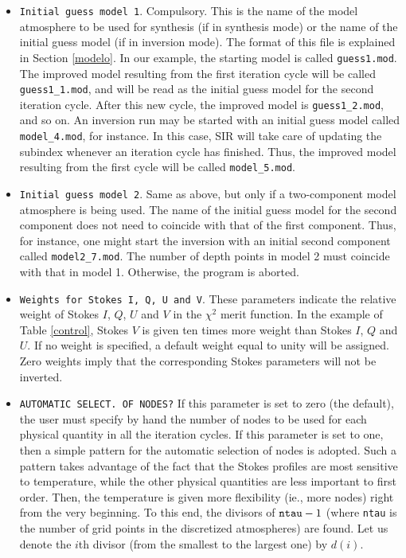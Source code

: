 \documentclass[11pt]{report}
\begin{document}
\begin{itemize}
\item {\tt Initial guess model 1}. Compulsory. This is the name of the model
atmosphere to be used for synthesis (if in synthesis mode) or the name of 
the initial guess model (if in inversion mode). The format of this file is
explained in Section \ref{modelo}. In our example, the starting model
is called {\tt guess1.mod}. The improved model resulting from the first iteration
cycle will be called {\tt guess1\_1.mod}, and will be read as the initial guess model
for the second iteration cycle. After this new cycle, the improved model is
{\tt guess1\_2.mod}, and so on. An inversion run may be started with an initial
guess model called {\tt model\_4.mod}, for instance. In this case, SIR will take
care of updating the subindex whenever an iteration cycle has finished. Thus, the
improved model resulting from the first cycle will be called {\tt model\_5.mod}. 

\item {\tt Initial guess model 2}. Same as above, but only if a two-component 
model atmosphere is being used. The name of the initial guess model for the second
component does not need to coincide with that of the first component. Thus, 
for instance, one might start the inversion with an initial second component
called {\tt model2\_7.mod}. The number of depth points in model 2 must coincide
with that in model 1. Otherwise, the program is aborted.

\item {\tt Weights for Stokes I, Q, U and V}. These parameters indicate
the relative weight of Stokes $I$, $Q$, $U$ and $V$ in the $\chi^2$
merit function. In the example of Table \ref{control}, Stokes $V$ is
given ten times more weight than Stokes $I$, $Q$ and $U$. If no weight
is specified, a default weight equal to unity will be assigned. Zero
weights imply that the corresponding Stokes parameters will not be
inverted.

\item {\tt AUTOMATIC SELECT. OF NODES?} If this parameter is set to
zero (the default), the user must specify by hand the number of nodes
to be used for each physical quantity in all the iteration cycles. If this
parameter is set to one, then a simple pattern for the automatic
selection of nodes is adopted. Such a pattern takes advantage of the
fact that the Stokes profiles are most sensitive to temperature, while
the other physical quantities are less important to first order. Then,
the temperature is given more flexibility (ie., more nodes) right from
the very beginning. To this end, the divisors of ${\tt ntau} - 1$
(where {\tt ntau} is the number of grid points in the discretized
atmospheres) are found. Let us denote the $i$th divisor (from the
smallest to the largest one) by $d(i)$.


\end{itemize}
\end{document}

